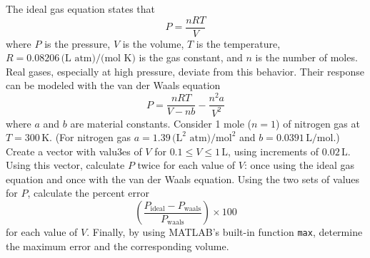 \documentclass[a4paper, 12pt]{report}
\def\ni{blue!20!white}
\def\link{blue!50!black}
\begin{document}
  
    
    \newpage
    \begin{tcolorbox}[title={\color{black}{\section{Q6}}}, colback=white, colframe=\ni, boxrule=1mm, width=1\textwidth]
    \centering
    The ideal gas equation states that
    \[P = \frac{nRT}{V}\]
    where \( P \) is the pressure, \( V \) is the volume, \( T \) is the temperature, \( R = 0.08206 \, \text{(L atm)/(mol K)} \) is the gas constant, and \( n \) is the number of moles. Real gases, especially at high pressure, deviate from this behavior. Their response can be modeled with the van der Waals equation
    \[P = \frac{nRT}{V - nb} - \frac{n^2 a}{V^2}\]
    where \( a \) and \( b \) are material constants. Consider 1 mole (\( n = 1 \)) of nitrogen gas at \( T = 300 \, \text{K} \). (For nitrogen gas \( a = 1.39 \, \text{(L}^2 \text{ atm)/mol}^2 \) and \( b = 0.0391 \, \text{L/mol} \).)
    Create a vector with valu3es of \( V \) for \( 0.1 \leq V \leq 1 \, \text{L} \), using increments of \( 0.02 \, \text{L} \). Using this vector, calculate \( P \) twice for each value of \( V \): once using the ideal gas equation and once with the van der Waals equation. Using the two sets of values for \( P \), calculate the percent error
    \[\left( \frac{P_{\text{ideal}} - P_{\text{waals}}}{P_{\text{waals}}} \right) \times 100\]
    for each value of \( V \). Finally, by using MATLAB's built-in function \texttt{max}, determine the maximum error and the corresponding volume.
    \end{tcolorbox}
    
    
\end{document}
